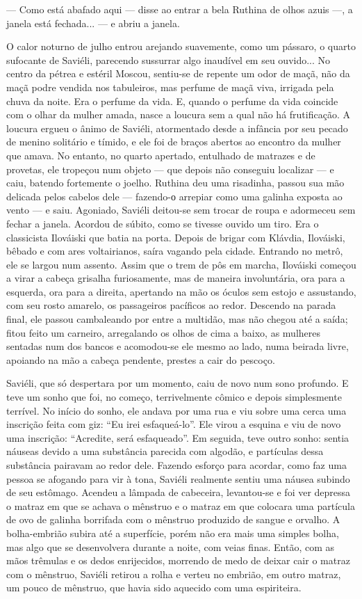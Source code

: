 --- Como está abafado aqui --- disse ao entrar a bela Ruthina de olhos
azuis ---, a janela está fechada... --- e abriu a janela.

O calor noturno de julho entrou arejando suavemente, como um pássaro, o
quarto sufocante de Saviéli, parecendo sussurrar algo inaudível em seu
ouvido... No centro da pétrea e estéril Moscou, sentiu-se de repente um
odor de maçã, não da maçã podre vendida nos tabuleiros, mas perfume de
maçã viva, irrigada pela chuva da noite. Era o perfume da vida. E,
quando o perfume da vida coincide com o olhar da mulher amada, nasce a
loucura sem a qual não há frutificação. A loucura ergueu o ânimo de
Saviéli, atormentado desde a infância por seu pecado de menino solitário
e tímido, e ele foi de braços abertos ao encontro da mulher que amava.
No entanto, no quarto apertado, entulhado de matrazes e de provetas, ele
tropeçou num objeto --- que depois não conseguiu localizar --- e caiu,
batendo fortemente o joelho. Ruthina deu uma risadinha, passou sua mão
delicada pelos cabelos dele --- fazendo-о arrepiar como uma galinha
exposta ao vento --- e saiu. Agoniado, Saviéli deitou-se sem trocar de
roupa e adormeceu sem fechar a janela. Acordou de súbito, como se
tivesse ouvido um tiro. Era o classicista Ilováiski que batia na porta.
Depois de brigar com Klávdia, Ilováiski, bêbado e com ares voltairianos,
saíra vagando pela cidade. Entrando no metrô, ele se largou num assento.
Assim que o trem de pôs em marcha, Ilováiski começou a virar a cabeça
grisalha furiosamente, mas de maneira involuntária, ora para a esquerda,
ora para a direita, apertando na mão os óculos sem estojo e assustando,
com seu rosto amarelo, os passageiros pacíficos ao redor. Descendo na
parada final, ele passou cambaleando por entre a multidão, mas não
chegou até a saída; fitou feito um carneiro, arregalando os olhos de
cima a baixo, as mulheres sentadas num dos bancos e acomodou-se ele
mesmo ao lado, numa beirada livre, apoiando na mão a cabeça pendente,
prestes a cair do pescoço.

Saviéli, que só despertara por um momento, caiu de novo num sono
profundo. E teve um sonho que foi, no começo, terrivelmente cômico e
depois simplesmente terrível. No início do sonho, ele andava por uma rua
e viu sobre uma cerca uma inscrição feita com giz: ``Eu irei
esfaqueá-lo''. Ele virou a esquina e viu de novo uma inscrição:
``Acredite, será esfaqueado''. Em seguida, teve outro sonho: sentia
náuseas devido a uma substância parecida com algodão, e partículas dessa
substância pairavam ao redor dele. Fazendo esforço para acordar, como
faz uma pessoa se afogando para vir à tona, Saviéli realmente sentiu uma
náusea subindo de seu estômago. Acendeu a lâmpada de cabeceira,
levantou-se e foi ver depressa o matraz em que se achava o mênstruo e o
matraz em que colocara uma partícula de ovo de galinha borrifada com o
mênstruo produzido de sangue e orvalho. A bolha-embrião subira até a
superfície, porém não era mais uma simples bolha, mas algo que se
desenvolvera durante a noite, com veias finas. Então, com as mãos
trêmulas e os dedos enrijecidos, morrendo de medo de deixar cair o
matraz com o mênstruo, Saviéli retirou a rolha e verteu no embrião, em
outro matraz, um pouco de mênstruo, que havia sido aquecido com uma
espiriteira.

